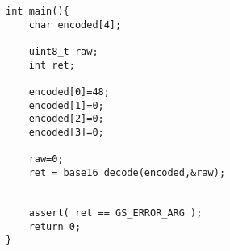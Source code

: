 \begin{lstlisting}[style=CStyle, caption=Test case derived for the example in Listing~\ref{GSLaugmentationTwo_klee}., label=GSLaugmentationTwo_kleeTest]
int main(){
    char encoded[4];

    uint8_t raw;
    int ret;

    encoded[0]=48;
    encoded[1]=0;
    encoded[2]=0;
    encoded[3]=0;

    raw=0;
    ret = base16_decode(encoded,&raw);


    assert( ret == GS_ERROR_ARG );
    return 0;
}
\end{lstlisting}

